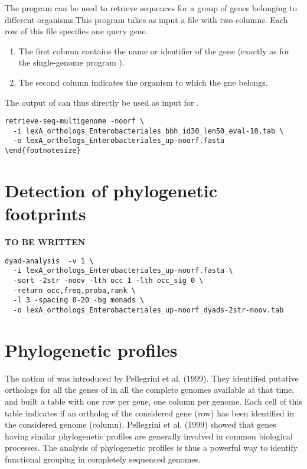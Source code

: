 The program  can be used to retrieve
sequences for a group of genes belonging to different organisms.This
program takes as input a file with two columns. Each row of this file
specifies one query gene.

\begin{enumerate}

\item The first column contains the name or identifier of the gene
  (exactly as for the single-genome program ).

\item The second column indicates the organism to which the gne belongs.

\end{enumerate}

The output of  can thus directly be used as
input for .

\begin{footnotesize}
\begin{verbatim}
retrieve-seq-multigenome -noorf \
  -i lexA_orthologs_Enterobacteriales_bbh_id30_len50_eval-10.tab \
  -o lexA_orthologs_Enterobacteriales_up-noorf.fasta
\end{footnotesize}
\end{verbatim}
\end{footnotesize}

\section{Detection of phylogenetic footprints}

\textbf{TO BE WRITTEN}

\begin{footnotesize}
\begin{verbatim}
dyad-analysis  -v 1 \
  -i lexA_orthologs_Enterobacteriales_up-noorf.fasta \
  -sort -2str -noov -lth occ 1 -lth occ_sig 0 \
  -return occ,freq,proba,rank \
  -l 3 -spacing 0-20 -bg monads \
  -o lexA_orthologs_Enterobacteriales_up-noorf_dyads-2str-noov.tab
\end{verbatim}
\end{footnotesize}

\section{Phylogenetic profiles}

The notion of  was introduced by
Pellegrini et al. (1999). They identified putative orthologs for all
the genes of  in all the complete genomes
available at that time, and built a table with one row per gene, one
column per genome. Each cell of this table indicates if an ortholog of
the considered gene (row) has been identified in the considered genome
(column). Pellegrini et al. (1999) showed that genes having similar
phylogenetic profiles are generally involved in common biological
processes. The analysis of phylogenetic profiles is thus a powerful
way to identify functional grouping in completely sequenced genomes.

